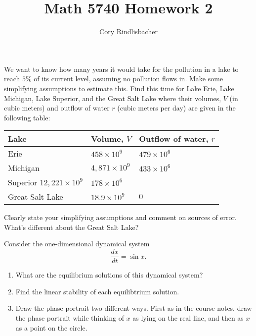 \documentclass[12pt]{article}
\newenvironment{exercise}[2][Exercise]{\begin{trivlist}
\item[\hskip \labelsep {\bfseries #1}\hskip \labelsep {\bfseries #2.}]}{\end{trivlist}}
\begin{document}
 
 
 
\title{Math 5740 Homework 2}%
\author{Cory Rindlisbacher\\ %
} %
 
\maketitle
 
\begin{exercise}{1} 
We want to know how many years it would take for the pollution in a lake to reach $5\%$ of its current level, assuming no pollution flows in. Make some simplifying assumptions to estimate this. Find this time for Lake Erie, Lake Michigan, Lake Superior, and the Great Salt Lake where their volumes, $V$ (in cubic meters) and outflow of water $r$ (cubic meters per day) are given in the following table: \\
\begin{center}
\begin{tabular}{lll}
Lake & Volume, $V$ & Outflow of water, $r$ \\ \hline
Erie & $458 \times 10^9$ & $479 \times 10^6$ \\
Michigan & $4,871 \times 10^9$ & $433 \times 10^6$ \\
Superior $12,221 \times 10^9$ & $178 \times 10^6$ \\
Great Salt Lake & $18.9 \times 10^9$ & $0$ \\
\end{tabular}
\end{center}

Clearly state your simplifying assumptions and comment on sources of error. What's different about the Great Salt Lake?

\end{exercise}
 
\begin{exercise}{2}
Consider the one-dimensional dynamical system 
$$\frac{dx}{dt} = \sin{x}.$$

\begin{enumerate}
\item[a)] What are the equilibrium solutions of this dynamical system?
\item[b)] Find the linear stability of each equilibtrium solution.
\item[c)] Draw the phase portrait two different ways. First as in the course notes, draw the phase portrait while thinking of $x$ as lying on the real line, and then as $x$ as a point on the circle.
\end{enumerate}
\end{exercise}
\end{document}
